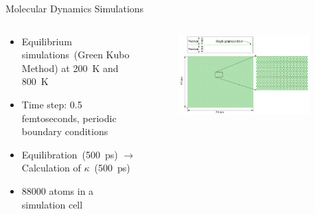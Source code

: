 \documentclass[handout,xcolor={x11names,table},compress,svgnames,mathserif]{beamer}
\renewcommand{\(}{\begin{columns}}
\renewcommand{\)}{\end{columns}}
\newcommand{\<}[1]{\begin{column}{#1}}
\renewcommand{\>}{\end{column}}
\newcommand*\myitem{%
  \item[\color{DeepSkyBlue4}\scalebox{0.6}{\ding{110}}]}
\begin{document}
\begin{frame}{Molecular Dynamics Simulations}

\begin{columns}
\begin{column}{0.6\textwidth}

\begin{itemize}
\small
\myitem Equilibrium simulations~(Green Kubo Method)
at 200~K and 800~K
\vspace{2mm}

\myitem Time step: 0.5 femtoseconds,  
periodic boundary conditions
\vspace{2mm}

\myitem Equilibration~(500~ps) 
$\rightarrow$ Calculation of $\kappa$~(500~ps)
\vspace{2mm}

\myitem 88000 atoms in a simulation cell

\end{itemize}

\end{column}

\begin{column}{0.4\textwidth}
%
\begin{figure}[htbp]
\begin{center}
\includegraphics[width=0.9\textwidth]{./Figures/Graphene}
\end{center}
\end{figure}
%

\end{column}
\end{columns}

\end{frame}

\end{document}
